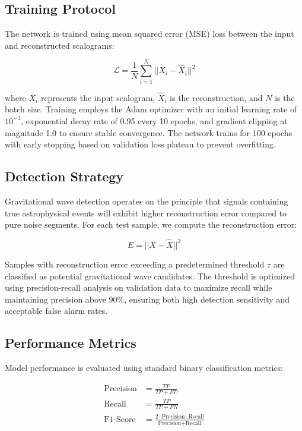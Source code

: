 \documentclass{iopjournal}
\begin{document}
\subsection{Training Protocol}

The network is trained using mean squared error (MSE) loss between the input and reconstructed scalograms:

\begin{equation}
\mathcal{L} = \frac{1}{N} \sum_{i=1}^{N} ||X_i - \hat{X}_i||^2
\end{equation}

where $X_i$ represents the input scalogram, $\hat{X}_i$ is the reconstruction, and $N$ is the batch size. Training employs the Adam optimizer with an initial learning rate of $10^{-3}$, exponential decay rate of 0.95 every 10 epochs, and gradient clipping at magnitude 1.0 to ensure stable convergence. The network trains for 100 epochs with early stopping based on validation loss plateau to prevent overfitting.

\subsection{Detection Strategy}

Gravitational wave detection operates on the principle that signals containing true astrophysical events will exhibit higher reconstruction error compared to pure noise segments. For each test sample, we compute the reconstruction error:

\begin{equation}
E = ||X - \hat{X}||^2
\end{equation}

Samples with reconstruction error exceeding a predetermined threshold $\tau$ are classified as potential gravitational wave candidates. The threshold is optimized using precision-recall analysis on validation data to maximize recall while maintaining precision above 90\%, ensuring both high detection sensitivity and acceptable false alarm rates.

\subsection{Performance Metrics}

Model performance is evaluated using standard binary classification metrics:

\begin{align}
\text{Precision} &= \frac{TP}{TP + FP} \\
\text{Recall} &= \frac{TP}{TP + FN} \\
\text{F1-Score} &= \frac{2 \cdot \text{Precision} \cdot \text{Recall}}{\text{Precision} + \text{Recall}}
\end{align}
\end{document}
